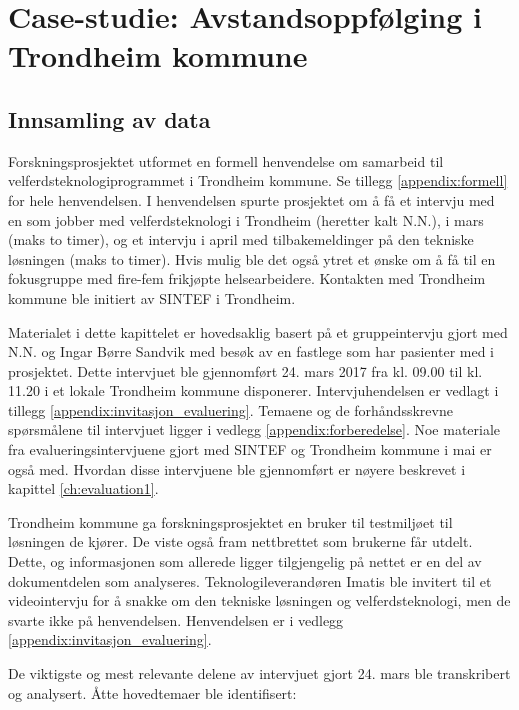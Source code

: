 \chapter{Case-studie: Avstandsoppfølging i Trondheim kommune}
\label{ch:case}

\section{Innsamling av data}
\label{sec:innsamling}
Forskningsprosjektet utformet en formell henvendelse om samarbeid til velferdsteknologiprogrammet i Trondheim kommune.
Se tillegg \ref{appendix:formell} for hele henvendelsen. I henvendelsen spurte prosjektet om å få et intervju med
en som jobber med velferdsteknologi i Trondheim (heretter kalt N.N.), i mars
(maks to timer), og et intervju i april med tilbakemeldinger på den tekniske løsningen (maks to timer). Hvis mulig ble det også
ytret et ønske om å få til en fokusgruppe med fire-fem frikjøpte helsearbeidere. Kontakten med Trondheim kommune ble initiert av SINTEF i Trondheim.

Materialet i dette kapittelet er hovedsaklig basert på et gruppeintervju gjort med N.N. og Ingar Børre Sandvik med besøk
av en fastlege som har pasienter med i prosjektet. Dette intervjuet ble gjennomført 24. mars 2017 fra kl. 09.00 til kl. 11.20 i
et lokale Trondheim kommune disponerer. Intervjuhendelsen er vedlagt i tillegg \ref{appendix:invitasjon_evaluering}. Temaene og
de forhåndsskrevne spørsmålene til intervjuet ligger i vedlegg \ref{appendix:forberedelse}.
Noe materiale fra evalueringsintervjuene gjort med SINTEF og Trondheim kommune i mai er
også med. Hvordan disse intervjuene ble gjennomført er nøyere beskrevet i kapittel \ref{ch:evaluation1}.

Trondheim kommune ga forskningsprosjektet en bruker til testmiljøet til løsningen de kjører. De viste også fram
nettbrettet som brukerne får utdelt. Dette, og informasjonen som allerede ligger tilgjengelig på nettet er en del
av dokumentdelen som analyseres. Teknologileverandøren Imatis ble invitert til et videointervju for å snakke om den tekniske
løsningen og velferdsteknologi, men de svarte ikke på henvendelsen. Henvendelsen er i vedlegg \ref{appendix:invitasjon_evaluering}.

De viktigste og mest relevante delene av intervjuet gjort 24. mars ble transkribert og analysert. Åtte hovedtemaer ble identifisert:

